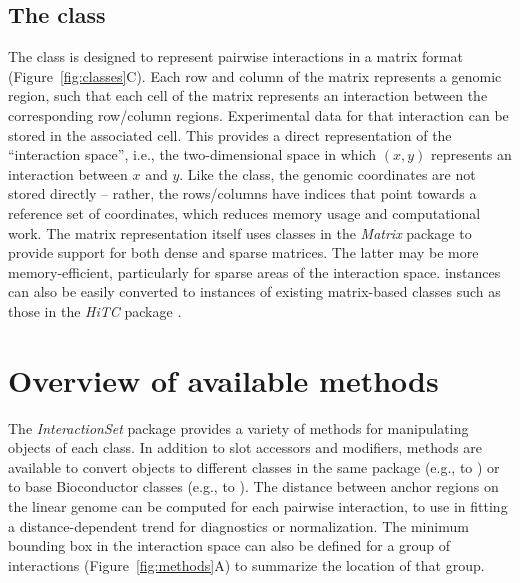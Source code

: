 \documentclass[10pt,a4paper,twocolumn]{article}
\begin{document}
\subsection*{The  class}
The  class is designed to represent pairwise interactions in a matrix format (Figure~\ref{fig:classes}C).
Each row and column of the matrix represents a genomic region, such that each cell of the matrix represents an interaction between the corresponding row/column regions.
Experimental data for that interaction can be stored in the associated cell.
This provides a direct representation of the ``interaction space'', i.e., the two-dimensional space in which $(x, y)$ represents an interaction between $x$ and $y$.
Like the  class, the genomic coordinates are not stored directly -- rather, the rows/columns have indices that point towards a reference set of coordinates, which reduces memory usage and computational work.
The matrix representation itself uses classes in the \textit{Matrix} package to provide support for both dense and sparse matrices.
The latter may be more memory-efficient, particularly for sparse areas of the interaction space.
 instances can also be easily converted to instances of existing matrix-based classes such as those in the \textit{HiTC} package \cite{servant2012hitc}.

\section*{Overview of available methods}
The \textit{InteractionSet} package provides a variety of methods for manipulating objects of each class.
In addition to slot accessors and modifiers, methods are available to convert objects to different classes in the same package (e.g.,  to ) or to base Bioconductor classes (e.g.,  to ).
The distance between anchor regions on the linear genome can be computed for each pairwise interaction, to use in fitting a distance-dependent trend \cite{aiden2009comprehensive} for diagnostics or normalization.
The minimum bounding box in the interaction space can also be defined for a group of interactions (Figure~\ref{fig:methods}A) to summarize the location of that group.
\end{document}
